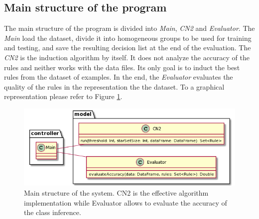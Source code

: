 \documentclass{article}
\begin{document}
\subsection{Main structure of the program}
The main structure of the program is divided into \textit{Main}, \textit{CN2} and \textit{Evaluator}. The \textit{Main} load the dataset, divide it into homogeneous groups to be used for training and testing, and save the resulting decision list at the end of the evaluation. The \textit{CN2} is the induction algorithm by itself. It does not analyze the accuracy of the rules and neither works with the data files. Its only goal is to induct the best rules from the dataset of examples. In the end, the \textit{Evaluator} evaluates the quality of the rules in the representation the the dataset.\newline
To a graphical representation please refer to Figure \ref{figure:main_structure}.
\begin{figure}[ht!]\centering
    \includegraphics[width=\textwidth]{pictures/main.png}
    \caption{Main structure of the system. CN2 is the effective algorithm implementation while Evaluator allows to evaluate the accuracy of the class inference.}
    \label{figure:main_structure}
\end{figure}
\end{document}
